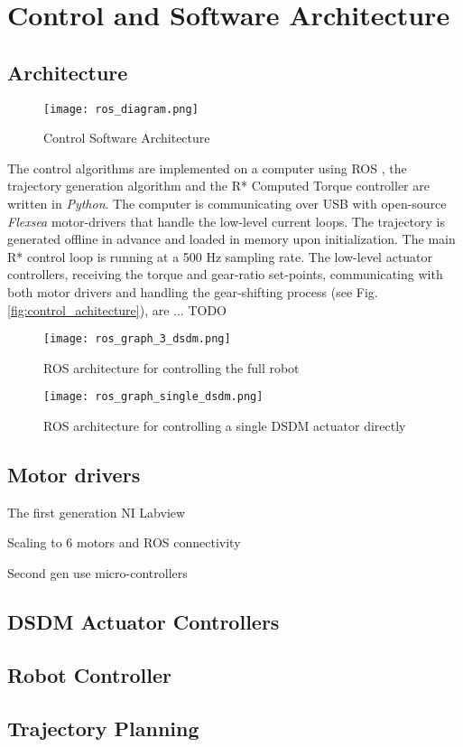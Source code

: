 \section{Control and Software Architecture}
\label{sec:ControlSoftwareArchitecture}

\subsection{Architecture}

\begin{figure}[H]
	\centering
		\texttt{[image: ros\_diagram.png]}
	\caption{Control Software Architecture}
	\label{fig:ros_diagram}
\end{figure}


The control algorithms are implemented on a computer using ROS \cite{quigley_ros:_2009}, the trajectory generation algorithm and the R* Computed Torque controller are written in \textit{Python}. The computer is communicating over USB with open-source \textit{Flexsea} motor-drivers that handle the low-level current loops. The trajectory is generated offline in advance and loaded in memory upon initialization. The main R* control loop is running at a 500 Hz sampling rate. The low-level actuator controllers, receiving the torque and gear-ratio set-points, communicating with both motor drivers and handling the gear-shifting process (see Fig. \ref{fig:control_achitecture}), are ... TODO


\begin{figure}[H]
	\centering
		\texttt{[image: ros\_graph\_3\_dsdm.png]}
	\caption{ROS architecture for controlling the full robot}
	\label{fig:ros_3dsdm}
\end{figure}


\begin{figure}[H]
	\centering
		\texttt{[image: ros\_graph\_single\_dsdm.png]}
	\caption{ROS architecture for controlling a single DSDM actuator directly}
	\label{fig:ros_dsdm}
\end{figure}


\subsection{Motor drivers}

The first generation NI Labview

Scaling to 6 motors and ROS connectivity

Second gen use micro-controllers \cite{duval_flexsea-execute:_2016} 

\subsection{DSDM Actuator Controllers}



\subsection{Robot Controller}

\subsection{Trajectory Planning }

